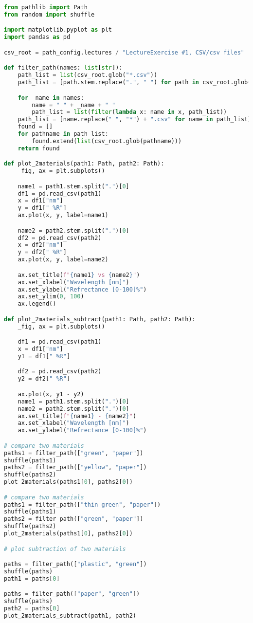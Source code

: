 \begin{lstlisting}[language=python, caption=Code for compare two materials, label={code:compare-materials}]
from pathlib import Path
from random import shuffle

import matplotlib.pyplot as plt
import pandas as pd

csv_root = path_config.lectures / "LectureExercise #1, CSV/csv files"

def filter_path(names: list[str]):
    path_list = list(csv_root.glob("*.csv"))
    path_list = [path.stem.replace(".", " ") for path in csv_root.glob("*.csv")]

    for _name in names:
        name = " " + _name + " "
        path_list = list(filter(lambda x: name in x, path_list))
    path_list = [name.replace(" ", "*") + ".csv" for name in path_list]
    found = []
    for pathname in path_list:
        found.extend(list(csv_root.glob(pathname)))
    return found

def plot_2materials(path1: Path, path2: Path):
    _fig, ax = plt.subplots()

    name1 = path1.stem.split(".")[0]
    df1 = pd.read_csv(path1)
    x = df1["nm"]
    y = df1[" %R"]
    ax.plot(x, y, label=name1)

    name2 = path2.stem.split(".")[0]
    df2 = pd.read_csv(path2)
    x = df2["nm"]
    y = df2[" %R"]
    ax.plot(x, y, label=name2)

    ax.set_title(f"{name1} vs {name2}")
    ax.set_xlabel("Wavelength [nm]")
    ax.set_ylabel("Refrectance [0-100]%")
    ax.set_ylim(0, 100)
    ax.legend()

def plot_2materials_subtract(path1: Path, path2: Path):
    _fig, ax = plt.subplots()

    df1 = pd.read_csv(path1)
    x = df1["nm"]
    y1 = df1[" %R"]

    df2 = pd.read_csv(path2)
    y2 = df2[" %R"]

    ax.plot(x, y1 - y2)
    name1 = path1.stem.split(".")[0]
    name2 = path2.stem.split(".")[0]
    ax.set_title(f"{name1} - {name2}")
    ax.set_xlabel("Wavelength [nm]")
    ax.set_ylabel("Refrectance [0-100]%")

# compare two materials
paths1 = filter_path(["green", "paper"])
shuffle(paths1)
paths2 = filter_path(["yellow", "paper"])
shuffle(paths2)
plot_2materials(paths1[0], paths2[0])

# compare two materials
paths1 = filter_path(["thin green", "paper"])
shuffle(paths1)
paths2 = filter_path(["green", "paper"])
shuffle(paths2)
plot_2materials(paths1[0], paths2[0])

# plot subtraction of two materials

paths = filter_path(["plastic", "green"])
shuffle(paths)
path1 = paths[0]

paths = filter_path(["paper", "green"])
shuffle(paths)
path2 = paths[0]
plot_2materials_subtract(path1, path2)

\end{lstlisting}

